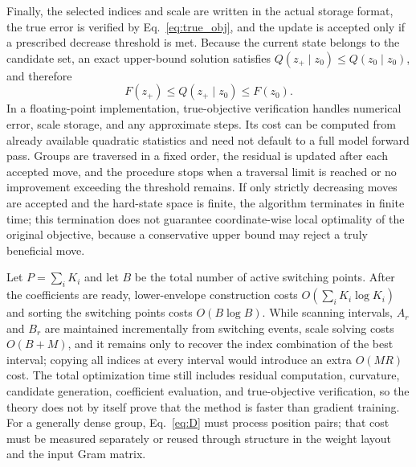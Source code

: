 Finally, the selected indices and scale are written in the actual storage format, the true error is verified by Eq.~\eqref{eq:true_obj}, and the update is accepted only if a prescribed decrease threshold is met.
Because the current state belongs to the candidate set, an exact upper-bound solution satisfies $Q(z_+\mid z_0)\le Q(z_0\mid z_0)$, and therefore
\begin{equation}
F(z_+)\le Q(z_+\mid z_0)\le F(z_0).
\label{eq:nonincrease}
\end{equation}
In a floating-point implementation, true-objective verification handles numerical error, scale storage, and any approximate steps.
Its cost can be computed from already available quadratic statistics and need not default to a full model forward pass.
Groups are traversed in a fixed order, the residual is updated after each accepted move, and the procedure stops when a traversal limit is reached or no improvement exceeding the threshold remains.
If only strictly decreasing moves are accepted and the hard-state space is finite, the algorithm terminates in finite time; this termination does not guarantee coordinate-wise local optimality of the original objective, because a conservative upper bound may reject a truly beneficial move.

Let $P=\sum_iK_i$ and let $B$ be the total number of active switching points.
After the coefficients are ready, lower-envelope construction costs $O(\sum_iK_i\log K_i)$ and sorting the switching points costs $O(B\log B)$.
While scanning intervals, $A_r$ and $B_r$ are maintained incrementally from switching events, scale solving costs $O(B+M)$, and it remains only to recover the index combination of the best interval; copying all indices at every interval would introduce an extra $O(MR)$ cost.
The total optimization time still includes residual computation, curvature, candidate generation, coefficient evaluation, and true-objective verification, so the theory does not by itself prove that the method is faster than gradient training.
For a generally dense group, Eq.~\eqref{eq:D} must process position pairs; that cost must be measured separately or reused through structure in the weight layout and the input Gram matrix.

